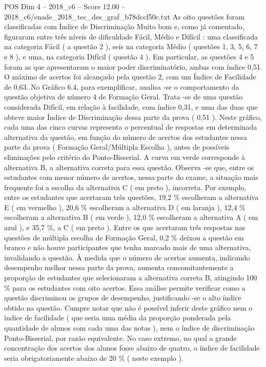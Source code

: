 \begin{textsample}{POS Dim 4 – 2018\_c6 – Score 12.00 – 2018\_c6/enade\_2018\_tec\_des\_graf\_b78dccf50c.txt}
As oito questões foram classificadas com Índice de Discriminação Muito bom e, como já comentado, figuraram entre três níveis de dificuldade Fácil, Médio e Difícil : uma classificada na categoria Fácil ( a questão 2 ), seis na categoria Médio ( questões 1, 3, 5, 6, 7 e 8 ), e uma, na categoria Difícil ( questão 4 ).
Em particular, as questões 4 e 5 foram as que apresentaram o maior poder discriminatório, ambas com índice 0,51.
O máximo de acertos foi alcançado pela questão 2, com um Índice de Facilidade de 0,63.
No Gráfico 6.4, para exemplificar, analisa -se o comportamento da questão objetiva de número 4 de Formação Geral.
Trata -se de uma questão considerada Difícil, em relação à facilidade, com índice 0,31, e uma das duas que obteve maior Índice de Discriminação dessa parte da prova ( 0,51 ).
Neste gráfico, cada uma das cinco curvas representa o percentual de respostas em determinada alternativa da questão, em função do número de acertos dos estudantes nessa parte da prova ( Formação Geral/Múltipla Escolha ), antes de possíveis eliminações pelo critério do Ponto-Bisserial.
A curva em verde corresponde à alternativa B, a alternativa correta para essa questão.
Observa -se que, entre os estudantes com menor número de acertos, nessa parte do exame, a situação mais frequente foi a escolha da alternativa C ( em preto ), incorreta.
Por exemplo, entre os estudantes que acertaram três questões, 19,2 \% escolheram a alternativa E ( em vermelho ), 20,6 \% escolheram a alternativa D ( em laranja ), 12,4 \% escolheram a alternativa B ( em verde ), 12,0 \% escolheram a alternativa A ( em azul ), e 35,7 \%, a C ( em preto ).
Entre os que acertaram três respostas nas questões de múltipla escolha de Formação Geral, 0,2 \% deixou a questão em branco e não houve participantes que tenha marcado mais de uma alternativa, invalidando a questão.
À medida que o número de acertos aumenta, indicando desempenho melhor nessa parte da prova, aumenta concomitantemente a proporção de estudantes que selecionaram a alternativa correta B, atingindo 100 \% para os estudantes com oito acertos.
Essa análise permite verificar como a questão discriminou os grupos de desempenho, justificando -se o alto índice obtido na questão.
Cumpre notar que não é possível inferir deste gráfico nem o índice de facilidade ( que seria uma média da proporção ponderada pela quantidade de alunos com cada uma das notas ), nem o índice de discriminação Ponto-Bisserial, por razão equivalente.
No caso extremo, no qual a grande concentração dos acertos dos alunos fosse abaixo de quatro, o índice de facilidade seria obrigatoriamente abaixo de 20 \% ( neste exemplo ).

\end{textsample}
